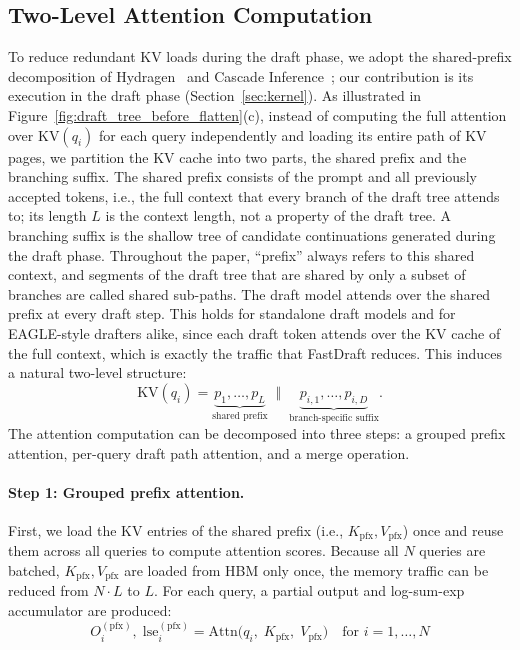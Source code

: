 \documentclass{article}
\begin{document}
\subsection{Two-Level Attention Computation}\label{sec:two-level_attn_comp}
To reduce redundant KV loads during the draft phase, we adopt the shared-prefix decomposition of Hydragen~\cite{hydragen} and Cascade Inference~\cite{cascade-inference}; our contribution is its execution in the draft phase (Section~\ref{sec:kernel}). As illustrated in Figure~\ref{fig:draft_tree_before_flatten}(c), instead of computing the full attention over $\mathrm{KV}(q_i)$ for each query independently and loading its entire path of KV pages, we partition the KV cache into two parts, the shared prefix and the branching suffix. The shared prefix consists of the prompt and all previously accepted tokens, i.e., the full context that every branch of the draft tree attends to; its length $L$ is the context length, not a property of the draft tree. A branching suffix is the shallow tree of candidate continuations generated during the draft phase. Throughout the paper, ``prefix'' always refers to this shared context, and segments of the draft tree that are shared by only a subset of branches are called shared sub-paths. The draft model attends over the shared prefix at every draft step. This holds for standalone draft models and for EAGLE-style drafters alike, since each draft token attends over the KV cache of the full context, which is exactly the traffic that FastDraft reduces.
This induces a natural two-level structure:
\[
\text{KV}(q_i) = 
\underbrace{p_1, \dots, p_L}_{\text{shared prefix}}
\;\; \Vert \;\;
\underbrace{p_{i,1}, \dots, p_{i,D}}_{\text{branch-specific suffix}}.
\]
The attention computation can be decomposed into three steps: a grouped
prefix attention, per-query draft path attention, and a merge operation.
 
\paragraph{Step 1: Grouped prefix attention.}
First, we load the KV entries of the shared prefix (i.e., $K_{\mathrm{pfx}}, V_{\mathrm{pfx}}$) once and reuse them across all queries to compute attention scores.
Because all $N$ queries are batched, $K_{\mathrm{pfx}}, V_{\mathrm{pfx}}$ are loaded from HBM only once, the memory traffic can be reduced from $N \cdot L$ to $L$.
For each query, a partial output and log-sum-exp accumulator are produced:
\begin{equation}
  O_i^{(\mathrm{pfx})},\; \mathrm{lse}_i^{(\mathrm{pfx})}
  = \mathrm{Attn}\!\bigl(q_i,\; K_{\mathrm{pfx}},\; V_{\mathrm{pfx}}\bigr)
  \quad \text{for } i = 1, \ldots, N
  \label{eq:pfx_output}
\end{equation}
\end{document}
